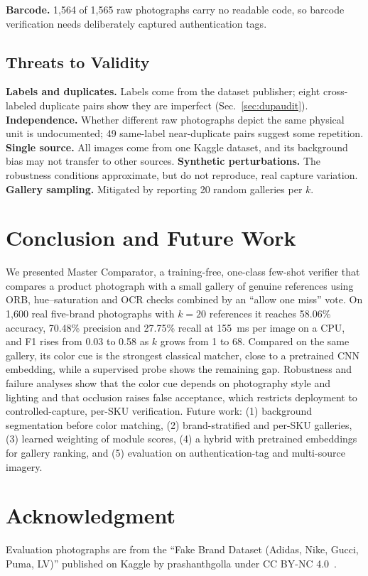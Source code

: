 \documentclass[conference]{IEEEtran}
\begin{document}
\textbf{Barcode.} 1{,}564 of 1{,}565 raw photographs carry no readable
code, so barcode verification needs deliberately captured authentication
tags.

\subsection{Threats to Validity}
\label{sec:threats}

\textbf{Labels and duplicates.} Labels come from the dataset publisher;
eight cross-labeled duplicate pairs show they are imperfect
(Sec.~\ref{sec:dupaudit}). \textbf{Independence.} Whether different raw
photographs depict the same physical unit is undocumented; 49 same-label
near-duplicate pairs suggest some repetition. \textbf{Single source.} All
images come from one Kaggle dataset, and its background bias may not
transfer to other sources. \textbf{Synthetic perturbations.} The
robustness conditions approximate, but do not reproduce, real capture
variation. \textbf{Gallery sampling.} Mitigated by reporting 20 random
galleries per $k$.

\section{Conclusion and Future Work}
\label{sec:conclusion}

We presented Master Comparator, a training-free, one-class few-shot
verifier that compares a product photograph with a small gallery of
genuine references using ORB, hue--saturation and OCR checks combined by
an ``allow one miss'' vote. On 1{,}600 real five-brand photographs with
$k{=}20$ references it reaches 58.06\% accuracy, 70.48\% precision and
27.75\% recall at 155~ms per image on a CPU, and F1 rises from 0.03 to
0.58 as $k$ grows from 1 to 68. Compared on the same gallery, its color
cue is the strongest classical matcher, close to a pretrained CNN
embedding, while a supervised probe shows the remaining gap. Robustness
and failure analyses show that the color cue depends on photography
style and lighting and that occlusion raises false acceptance, which
restricts deployment to controlled-capture, per-SKU verification. Future
work: (1) background segmentation before color matching, (2)
brand-stratified and per-SKU galleries, (3) learned weighting of module
scores, (4) a hybrid with pretrained embeddings for gallery ranking, and
(5) evaluation on authentication-tag and multi-source imagery.

\section*{Acknowledgment}
Evaluation photographs are from the ``Fake Brand Dataset (Adidas, Nike,
Gucci, Puma, LV)'' published on Kaggle by prashanthgolla under CC BY-NC
4.0~\cite{kaggledata}.
\end{document}
